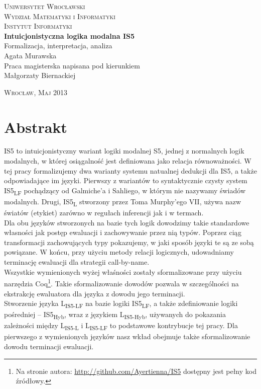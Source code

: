 \documentclass[a4paper,12pt]{report}
\newcommand{\logic}{IS5}
\newcommand{\clogic}{S5}
\newcommand{\logicL}{IS5\textsubscript{L}}
\newcommand{\logicLF}{IS5\textsubscript{LF}}
\newcommand{\logicHyb}{IS5\textsubscript{Hyb}}
\newcommand{\langL}{L\textsubscript{IS5-L}}
\newcommand{\langLF}{L\textsubscript{IS5-LF}}
\newcommand{\langHyb}{L\textsubscript{IS5-Hyb}}
\theoremstyle{introtheoremBstyle}
\theoremstyle{plain}
\begin{document}
\newpage
\begin{center}
\textsc{\large Uniwersytet Wrocławski\\
Wydział Matematyki i Informatyki\\
Instytut Informatyki}\\
\vspace{4cm}
\Huge{\textbf{Intuicjonistyczna logika modalna \logic}}\\
\Large{\textmd{Formalizacja, interpretacja, analiza}}\\
\vspace{3cm}
\textmd{\Large Agata Murawska}\\
\vspace{3cm}
{\large Praca magisterska napisana pod kierunkiem \\Małgorzaty Biernackiej }
\end{center}
\vfill
\begin{center}
\textsc{Wrocław, Maj 2013}
\end{center}

\newpage
\chapter*{Abstrakt}


\logic{} to intuicjonistyczny wariant logiki modalnej \clogic{}, jednej z normalnych logik modalnych, w której osiągalność jest definiowana jako relacja równoważności. W tej pracy formalizujemy dwa warianty systemu natualnej dedukcji dla \logic{}, a także odpowiadające im języki. Pierwszy z wariantów to syntaktycznie czysty system \logicLF{} pochądzący od Galmiche'a i Sahliego, w którym nie nazywamy świadów modalnych. Drugi, \logicL{} stworzony przez Toma Murphy'ego VII, używa nazw światów (etykiet) zarówno w regułach inferencji jak i w termach.\\

Dla obu języków stworzonych na bazie tych logik dowodzimy takie standardowe własności jak postęp ewaluacji i zachowywanie przez nią typów. Poprzez ciąg transformacji zachowujących typy pokazujemy, w jaki sposób języki te są ze sobą powiązane. W końcu, przy użyciu metody relacji logicznych, udowadniamy terminację ewaluacji dla strategii call-by-name.\\

Wszystkie wymienionych wyżej właśności zostały sformalizowane przy użyciu narzędzia Coq\footnote{Na stronie autora: \url{http://github.com/Ayertienna/IS5} dostępny jest pełny kod źródłowy.}. Takie sformalizowanie dowodów pozwala w szczególności na ekstrakcję ewaluatora dla języka z dowodu jego terminacji.\\

Stworzenie języka \langLF{} na bazie logiki \logicLF{}, a także zdefiniowanie logiki pośredniej -- \logicHyb{}, wraz z językiem \langHyb{}, używanych do pokazania zależności między \langL{} i \langLF{} to podstawowe kontrybucje tej pracy. Dla pierwszego z wymienionych języków nasz wkład obejmuje także sformalizowanie dowodu terminacji ewaluacji.
\end{document}
